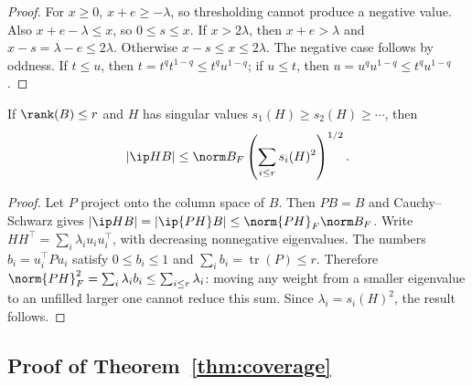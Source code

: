\begin{proof}
For $x\ge0$, $x+e\ge-\lambda$, so thresholding cannot produce a negative value. Also $x+e-\lambda\le x$, so $0\le s\le x$. If $x>2\lambda$, then $x+e>\lambda$ and $x-s=\lambda-e\le2\lambda$. Otherwise $x-s\le x\le2\lambda$. The negative case follows by oddness. If $t\le u$, then $t=t^q t^{1-q}\le t^q u^{1-q}$; if $u\le t$, then $u=u^q u^{1-q}\le t^q u^{1-q}$.
\end{proof}

\begin{lemma}\label{lem:structural}
If $\rank(B)\le r$ and $H$ has singular values $s_1(H)\ge s_2(H)\ge\cdots$, then
\[
 |\ip HB|\le\norm B_F\left(\sum_{i\le r}s_i(H)^2\right)^{1/2}.
\]
\end{lemma}

\begin{proof}
Let $P$ project onto the column space of $B$. Then $PB=B$ and Cauchy--Schwarz gives $|\ip HB|=|\ip{PH}B|\le\norm{PH}_F\norm B_F$. Write $HH^\top=\sum_i\lambda_i u_i u_i^\top$, with decreasing nonnegative eigenvalues. The numbers $b_i=u_i^\top P u_i$ satisfy $0\le b_i\le1$ and $\sum_i b_i=\operatorname{tr}(P)\le r$. Therefore $\norm{PH}_F^2=\sum_i\lambda_i b_i\le\sum_{i\le r}\lambda_i$: moving any weight from a smaller eigenvalue to an unfilled larger one cannot reduce this sum. Since $\lambda_i=s_i(H)^2$, the result follows.
\end{proof}

\subsection{Proof of Theorem~\ref{thm:coverage}}

